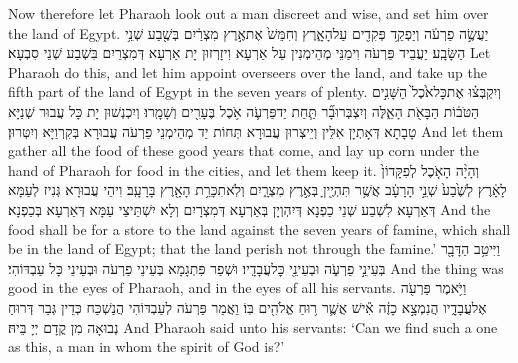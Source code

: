 {Now therefore let Pharaoh look out a man discreet and wise, and set him over the land of Egypt.}{}
{יַעֲשֶׂ֣ה פַרְעֹ֔ה וְיַפְקֵ֥ד פְּקִדִ֖ים עַל\maqqaf הָאָ֑רֶץ וְחִמֵּשׁ֙ אֶת\maqqaf אֶ֣רֶץ מִצְרַ֔יִם בְּשֶׁ֖בַע שְׁנֵ֥י הַשָּׂבָֽע׃}
{יַעֲבֵיד פַּרְעֹה וִימַנֵּי מְהֵימְנִין עַל אַרְעָא וִיזָרְזוּן יָת אַרְעָא דְּמִצְרַיִם בִּשְׁבַע שְׁנֵי סִבְעָא׃}
{Let Pharaoh do this, and let him appoint overseers over the land, and take up the fifth part of the land of Egypt in the seven years of plenty.}{}
{וְיִקְבְּצ֗וּ אֶת\maqqaf כׇּל\maqqaf אֹ֙כֶל֙ הַשָּׁנִ֣ים הַטֹּב֔וֹת הַבָּאֹ֖ת הָאֵ֑לֶּה וְיִצְבְּרוּ\maqqaf בָ֞ר תַּ֧חַת יַד\maqqaf פַּרְעֹ֛ה אֹ֥כֶל בֶּעָרִ֖ים וְשָׁמָֽרוּ׃}
{וְיִכְנְשׁוּן יָת כָּל עֲבוּר שְׁנַיָּא טָבָתָא דְּאָתְיָן אִלֵּין וְיֵיצְרוּן עֲבוּרָא תְּחוֹת יַד מְהֵימְנֵי פַרְעֹה עֲבוּרָא בְּקִרְוַיָּא וְיִטְּרוּן׃}
{And let them gather all the food of these good years that come, and lay up corn under the hand of Pharaoh for food in the cities, and let them keep it.}{}
{וְהָיָ֨ה הָאֹ֤כֶל לְפִקָּדוֹן֙ לָאָ֔רֶץ לְשֶׁ֙בַע֙ שְׁנֵ֣י הָרָעָ֔ב אֲשֶׁ֥ר תִּהְיֶ֖יןָ בְּאֶ֣רֶץ מִצְרָ֑יִם וְלֹֽא\maqqaf תִכָּרֵ֥ת הָאָ֖רֶץ בָּרָעָֽב׃}
{וִיהֵי עֲבוּרָא גְּנִיז לְעַמָּא דְּאַרְעָא לִשְׁבַע שְׁנֵי כַפְנָא דְּיִהְוְיָן בְּאַרְעָא דְּמִצְרָיִם וְלָא יִשְׁתֵּיצֵי עַמָּא דְּאַרְעָא בְּכַפְנָא׃}
{And the food shall be for a store to the land against the seven years of famine, which shall be in the land of Egypt; that the land perish not through the famine.’}{}
{וַיִּיטַ֥ב הַדָּבָ֖ר בְּעֵינֵ֣י פַרְעֹ֑ה וּבְעֵינֵ֖י כׇּל\maqqaf עֲבָדָֽיו׃}
{וּשְׁפַר פִּתְגָמָא בְּעֵינֵי פַרְעֹה וּבְעֵינֵי כָּל עַבְדּוֹהִי׃}
{And the thing was good in the eyes of Pharaoh, and in the eyes of all his servants.}{}
\newseder
{}%
{וַיֹּ֥אמֶר פַּרְעֹ֖ה אֶל\maqqaf עֲבָדָ֑יו הֲנִמְצָ֣א כָזֶ֔ה אִ֕ישׁ אֲשֶׁ֛ר ר֥וּחַ אֱלֹהִ֖ים בּֽוֹ׃}
{וַאֲמַר פַּרְעֹה לְעַבְדּוֹהִי הֲנַשְׁכַּח כְּדֵין גְּבַר דְּרוּחַ נְבוּאָה מִן קֳדָם יְיָ בֵּיהּ׃}
{And Pharaoh said unto his servants: ‘Can we find such a one as this, a man in whom the spirit of God is?’}{}
